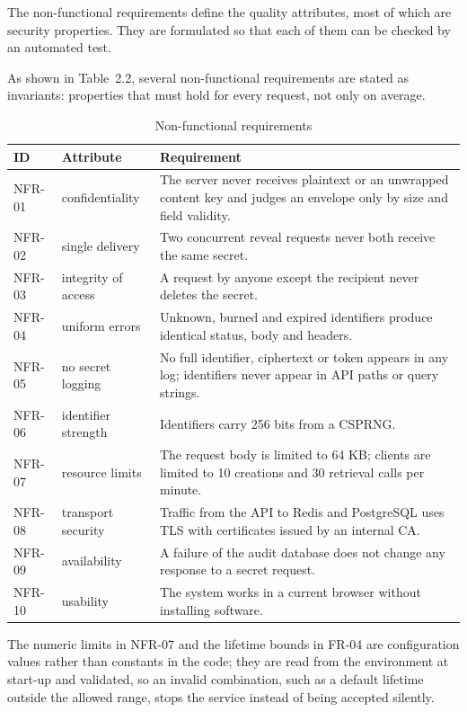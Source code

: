 \documentclass[12pt,a4paper]{article}
\numberwithin{equation}{section}
\numberwithin{figure}{section}
\numberwithin{table}{section}
\newcommand{\tablesetup}{\fontsize{11pt}{13pt}\selectfont\singlespacing\renewcommand{\arraystretch}{1.15}}
\newcommand{\leadin}[1]{%
  {\onehalfspacing\setlength{\parindent}{1.25cm}\indent #1\par}\vspace{8pt}}
\begin{document}
The non-functional requirements define the quality attributes, most of which are security properties. They are formulated so that each of them can be checked by an automated test.

\begin{table}[H]
\leadin{As shown in Table~2.2, several non-functional requirements are stated as invariants: properties that must hold for every request, not only on average.}
\tablesetup
\caption{Non-functional requirements}
\label{tab:nfr}
\begin{tabularx}{\textwidth}{|P{0.08\textwidth}|P{0.17\textwidth}|L|}
\hline
\textbf{ID} & \textbf{Attribute} & \textbf{Requirement} \\ \hline
NFR-01 & confidentiality & The server never receives plaintext or an unwrapped content key and judges an envelope only by size and field validity. \\ \hline
NFR-02 & single delivery & Two concurrent reveal requests never both receive the same secret. \\ \hline
NFR-03 & integrity of access & A request by anyone except the recipient never deletes the secret. \\ \hline
NFR-04 & uniform errors &Unknown, burned and expired identifiers produce identical status, body and headers. \\ \hline
NFR-05 & no secret logging & No full identifier, ciphertext or token appears in any log; identifiers never appear in API paths or query strings. \\ \hline
NFR-06 & identifier strength & Identifiers carry 256 bits from a CSPRNG. \\ \hline
NFR-07 & resource limits & The request body is limited to 64 KB; clients are limited to 10 creations and 30 retrieval calls per minute. \\ \hline
NFR-08 & transport security & Traffic from the API to Redis and PostgreSQL uses TLS with certificates issued by an internal CA. \\ \hline
NFR-09 & availability & A failure of the audit database does not change any response to a secret request. \\ \hline
NFR-10 & usability & The system works in a current browser without installing software. \\ \hline
\end{tabularx}
\end{table}

The numeric limits in NFR-07 and the lifetime bounds in FR-04 are configuration values rather than constants in the code; they are read from the environment at start-up and validated, so an invalid combination, such as a default lifetime outside the allowed range, stops the service instead of being accepted silently.
\end{document}
